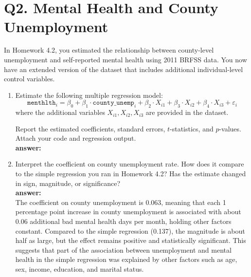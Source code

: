\documentclass[12pt]{article}
\begin{document}
\section*{Q2. Mental Health and County Unemployment}

In Homework 4.2, you estimated the relationship between county-level unemployment and self-reported mental health using 2011 BRFSS data. You now have an extended version of the dataset that includes additional individual-level control variables.

\begin{enumerate}[label=\alph*)]
    \item Estimate the following multiple regression model:
    \[
    \texttt{menthlth}_i = \beta_0 + \beta_1 \cdot \texttt{county\_unemp}_i + \beta_2 \cdot X_{i1} + \beta_3 \cdot X_{i2} + \beta_4 \cdot X_{i3} + \varepsilon_i
    \]
    where the additional variables \(X_{i1}, X_{i2}, X_{i3}\) are provided in the dataset.

    Report the estimated coefficients, standard errors, $t$-statistics, and $p$-values. Attach your code and regression output.\\
    \textbf{answer:}
    
    
    \item Interpret the coefficient on county unemployment rate. How does it compare to the simple regression you ran in Homework 4.2? Has the estimate changed in sign, magnitude, or significance?\\
    \textbf{answer:}\\
    The coefficient on county unemployment is 0.063, meaning that each 1 percentage point increase in county unemployment is associated with about 0.06 additional bad mental health days per month, holding other factors constant. Compared to the simple regression (0.137), the magnitude is about half as large, but the effect remains positive and statistically significant. This suggests that part of the association between unemployment and mental health in the simple regression was explained by other factors such as age, sex, income, education, and marital status.
    
\end{enumerate}
\end{document}

